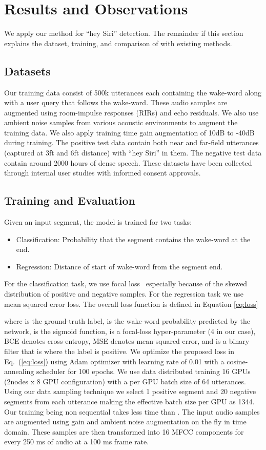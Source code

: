 \section{Results and Observations}
We apply our method for ``hey Siri'' detection. The remainder if this section explains the dataset, training, and comparison of \prjname with existing methods.



\subsection{Datasets}
Our training data consist of 500k utterances each containing the wake-word along with a user query that follows the wake-word. These audio samples are augmented using room-impulse responses (RIRs) and echo residuals. We also use ambient noise samples from various acoustic environments to augment the training data. We also apply training time gain augmentation of 10dB to -40dB during training. The positive test data contain both near and far-field utterances (captured at 3ft and 6ft distance) with ``hey Siri'' in them. The negative test data contain around 2000 hours of dense speech. These datasets have been collected through internal user studies with informed consent approvals.
\subsection{Training and Evaluation}
Given an input segment, the model is trained for two tasks:
\begin{itemize}
    \item Classification: Probability that the segment contains the wake-word at the end.
    \item Regression: Distance of start of wake-word from the segment end.
\end{itemize}
For the classification task, we use focal loss~\cite{lin2017focal} especially because of the skewed distribution of positive and negative samples. For the regression task we use mean squared error loss. The overall loss function is defined in Equation \ref{eq:loss}

where  is the ground-truth label,  is the wake-word probability predicted by the network,  is the sigmoid function,  is a focal-loss hyper-parameter (4 in our case), BCE denotes cross-entropy, MSE denotes mean-squared error, and  is a binary filter that is  where the label is positive. We optimize the proposed loss in Eq.~(\ref{eq:loss}) using Adam optimizer \cite{kingma2014adam} with learning rate of 0.01 with a cosine-annealing scheduler for 100 epochs. We use data distributed training 16 GPUs (2nodes x 8 GPU configuration) with a per GPU batch size of 64 utterances. Using our data sampling technique we select 1 positive  segment and 20 negative segments from each utterance making the effective batch size per GPU as 1344. Our training being non sequential takes  less time than \cite{shrivastava2021optimize}. The input audio samples are augmented using gain and ambient noise augmentation on the fly in time domain. These samples are then transformed into 16 MFCC components for every 250 ms of audio at a 100 ms frame rate.

